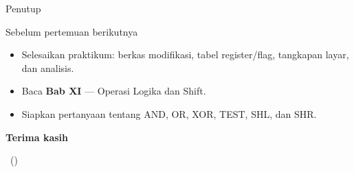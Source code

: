 \documentclass[aspectratio=169,11pt]{beamer}
\begin{document}
\begin{frame}{Penutup}
\begin{block}{Sebelum pertemuan berikutnya}
\small
\begin{itemize}
    \item Selesaikan praktikum: berkas  modifikasi,
          tabel register/flag, tangkapan layar, dan analisis.
    \item Baca \textbf{Bab XI} — Operasi Logika dan Shift.
    \item Siapkan pertanyaan tentang AND, OR, XOR, TEST, SHL, dan
          SHR.
\end{itemize}
\end{block}

\vspace{0.4em}
\begin{center}
{\color{obeBlue}\sffamily\large\bfseries Terima kasih\par}
\vspace{0.15em}
{\color{obeGray}\sffamily\small \NamaMK\ (\KodeMK)
\textbullet\ \SemesterTeks\par}
\end{center}
\end{frame}
\end{document}
